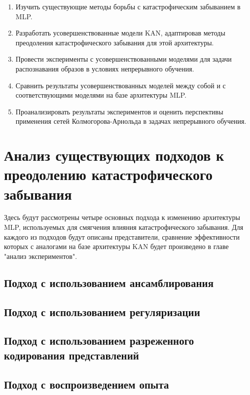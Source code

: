 \documentclass[a4paper,article,14pt]{extarticle}
\begin{document}
\begin{enumerate}
    \item Изучить существующие методы борьбы с катастрофическим забыванием в 
    MLP.
    \item Разработать усовершенствованные модели KAN, адаптировав методы 
    преодоления катастрофического забывания для этой архитектуры.
    \item Провести эксперименты с усовершенствованными моделями для задачи 
    распознавания образов в условиях непрерывного обучения.
    \item Сравнить результаты усовершенствованных моделей между собой и с 
    соответствующими моделями на базе архитектуры MLP.
    \item Проанализировать результаты экспериментов и оценить перспективы 
    применения сетей Колмогорова-Арнольда в задачах непрерывного обучения.
\end{enumerate}

\pagebreak


\pagebreak

\section{Анализ существующих подходов к преодолению катастрофического забывания}

Здесь будут рассмотрены четыре основных подхода к изменению архитектуры MLP, используемых для смягчения влияния катастрофического забывания. Для каждого из подходов будут описаны представители, сравнение эффективности которых с аналогами на базе архитектуры KAN будет произведено в главе "анализ экспериментов".

\subsection{Подход с использованием ансамблирования}

\subsection{Подход с использованием регуляризации}

\subsection{Подход с использованием разреженного кодирования представлений}

\subsection{Подход с воспроизведением опыта}
\end{document}
